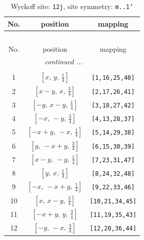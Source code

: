 \documentclass[fleqn,8pt]{jsarticle}
\begin{document}
\begin{longtable}{ccc}
\caption{Wyckoff site: {\tt 12j}, site symmetry: {\tt m..1'}}
 \\
 \hline \hline
No. & position & mapping \\ \hline \endfirsthead

\multicolumn{2}{l}{\tablename\ \thetable{}} \\
 \hline \hline
No. & position & mapping \\ \hline \endhead

 \hline \hline
\multicolumn{2}{r}{\footnotesize\it continued ...} \\ \endfoot

 \hline \hline
\multicolumn{2}{r}{} \\ \endlastfoot

1 & $\left[ x,\, y,\, \frac{1}{4} \right]$ & {\tt [1,16,25,40]} \\ \hline
2 & $\left[ x - y,\, x,\, \frac{3}{4} \right]$ & {\tt [2,17,26,41]} \\ \hline
3 & $\left[ - y,\, x - y,\, \frac{1}{4} \right]$ & {\tt [3,18,27,42]} \\ \hline
4 & $\left[ - x,\, - y,\, \frac{3}{4} \right]$ & {\tt [4,13,28,37]} \\ \hline
5 & $\left[ - x + y,\, - x,\, \frac{1}{4} \right]$ & {\tt [5,14,29,38]} \\ \hline
6 & $\left[ y,\, - x + y,\, \frac{3}{4} \right]$ & {\tt [6,15,30,39]} \\ \hline
7 & $\left[ x - y,\, - y,\, \frac{1}{4} \right]$ & {\tt [7,23,31,47]} \\ \hline
8 & $\left[ y,\, x,\, \frac{1}{4} \right]$ & {\tt [8,24,32,48]} \\ \hline
9 & $\left[ - x,\, - x + y,\, \frac{1}{4} \right]$ & {\tt [9,22,33,46]} \\ \hline
10 & $\left[ x,\, x - y,\, \frac{3}{4} \right]$ & {\tt [10,21,34,45]} \\ \hline
11 & $\left[ - x + y,\, y,\, \frac{3}{4} \right]$ & {\tt [11,19,35,43]} \\ \hline
12 & $\left[ - y,\, - x,\, \frac{3}{4} \right]$ & {\tt [12,20,36,44]} \\
\end{longtable}
\renewcommand{\arraystretch}{1.2}
\end{document}
